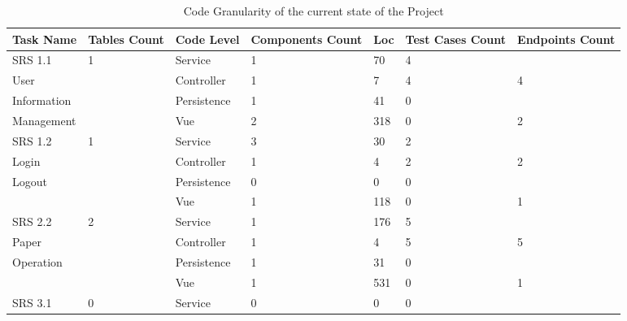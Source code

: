 \documentclass[conference]{IEEEtran}
\begin{document}
\begin{table}[!htb]
	\renewcommand{\arraystretch}{1.3}
	\caption{Code Granularity of the current state of the Project}
	\centering
	\begin{tabular}{p{2cm}p{1.5cm}p{2cm}p{3cm}p{1.5cm}p{3cm}l}
		\hline
		Task Name   & Tables Count & Code Level                  & Components Count & Loc & Test Cases Count & Endpoints Count \\
		\hline
		SRS 1.1     & 1            & Service                     & 1                & 70  & 4                &                 \\
		User        &              & Controller                  & 1                & 7   & 4                & 4               \\
		Information &              & Persistence\footnotemark[1] & 1                & 41  & 0                &                 \\
		Management  &              & Vue \footnotemark[2]        & 2                & 318 & 0                & 2               \\
		\hline
		SRS 1.2     & 1            & Service                     & 3                & 30  & 2                &                 \\
		Login       &              & Controller                  & 1                & 4   & 2                & 2               \\
		Logout      &              & Persistence                 & 0                & 0   & 0                &                 \\
		            &              & Vue                         & 1                & 118 & 0                & 1               \\
		\hline
		SRS 2.2     & 2            & Service                     & 1                & 176 & 5                &                 \\
		Paper       &              & Controller                  & 1                & 4   & 5                & 5               \\
		Operation   &              & Persistence                 & 1                & 31  & 0                &                 \\
		            &              & Vue                         & 1                & 531 & 0                & 1               \\
		\hline
		SRS 3.1     & 0            & Service                     & 0                & 0   & 0                &                 \\

\end{tabular}
\end{table}
\end{document}
